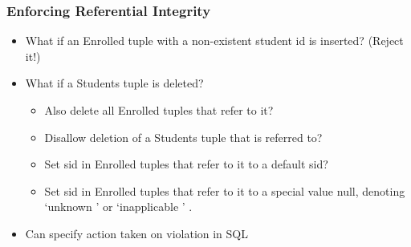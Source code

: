\documentclass[11pt]{article}
\begin{document}
\subsubsection{Enforcing Referential Integrity}
\label{sec:orgb539f9e}
\begin{itemize}
\item What if an Enrolled tuple with a non-existent student id is inserted? (Reject it!)
\item What if a Students tuple is deleted?
\begin{itemize}
\item Also delete all Enrolled tuples that refer to it?
\item Disallow deletion of a Students tuple that is referred to?
\item Set sid in Enrolled tuples that refer to it to a default sid?
\item Set sid in Enrolled tuples that refer to it to a special value null, denoting `unknown ’ or `inapplicable ’ .
\end{itemize}
\item Can specify action taken on violation in SQL
\end{itemize}
\end{document}
